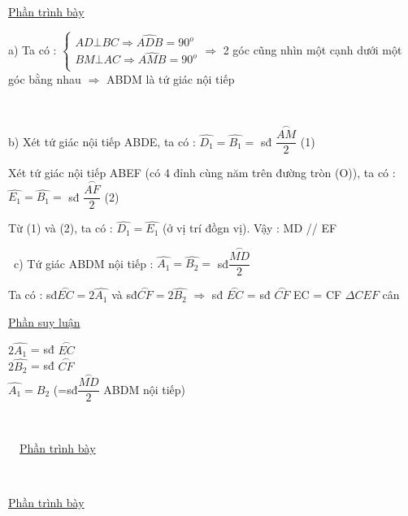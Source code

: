 \documentclass[12pt]{article}
\begin{document}
{\begin{multicols}{2}
\columnbreak
\underline{Phần trình bày} \par
a) Ta có :
$\begin{cases}
    AD \bot BC \Rightarrow \widehat{ADB} = 90^o \\
    BM \bot AC \Rightarrow \widehat{AMB} = 90^o \\
\end{cases} \Rightarrow$ 2 góc cũng nhìn một cạnh dưới một góc bằng nhau $\Rightarrow$ ABDM là tứ giác nội tiếp \par

\   

b) Xét tứ giác nội tiếp ABDE, ta có : $\widehat{D_1} = \widehat{B_1} =$ sđ $\dfrac{\stackrel\frown{AM}}{2}$ (1) \par
Xét tứ giác nội tiếp ABEF (có 4 đỉnh cùng năm trên đường tròn (O)), ta có : $\widehat{E_1} = \widehat{B_1} =$ sđ $\dfrac{\stackrel\frown{AF}}{2}$ (2) \par

Từ (1) và (2), ta có : $\widehat{D_1} = \widehat{E_1}$ (ở vị trí đồgn vị). Vậy : MD // EF \par 

\   
c) Tứ giác ABDM nội tiếp : $\widehat{A_1} = \widehat{B_2} =$ sđ$\dfrac{\stackrel\frown{MD}}{2}$ \par
Ta có : sđ$\stackrel\frown{EC} = 2\widehat{A_1}$ và sđ$\stackrel\frown{CF} = 2\widehat{B_2}$ $\Rightarrow$ sđ $\stackrel\frown{EC}$ = sđ $\stackrel\frown{CF}$ \Rightarrow  EC = CF \Rightarrow  $ \Delta CEF$ cân
\end{multicols}

\break

\begin{multicols}{2}
\underline{Phần suy luận} \par
\begin{cases}
        $2\widehat{A_1}$ = sđ $\stackrel\frown{EC}$\\
        $2\widehat{B_2}$ = sđ $\stackrel\frown{CF}$\\
        $\widehat{A_1} = \widehat{B_2}$ (=sđ$\dfrac{\stackrel\frown{MD}}{2}$ ABDM nội tiếp) \par
\end{cases}
\columnbreak
\    
\    

\    
\    
\underline{Phần trình bày} \par
\   
\   
\    
\   
\   
\end{multicols}

\underline{Phần trình bày} \par

}
\end{document}

